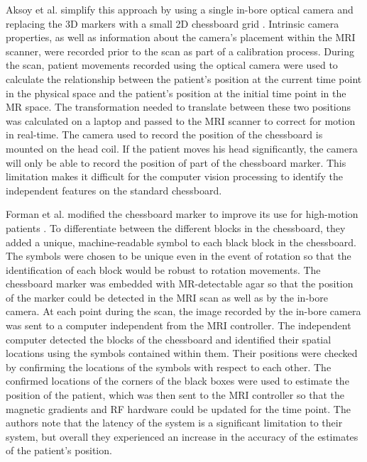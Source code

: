 Aksoy et al. simplify this approach by using a single in-bore optical camera and replacing the 3D markers with a small 2D chessboard grid \cite{Aksoy2008}. Intrinsic camera properties, as well as information about the camera's placement within the MRI scanner, were recorded prior to the scan as part of a calibration process. During the scan, patient movements recorded using the optical camera were used to calculate the relationship between the patient's position at the current time point in the physical space and the patient's position at the initial time point in the MR space. The transformation needed to translate between these two positions was calculated on a laptop and passed to the MRI scanner to correct for motion in real-time. The camera used to record the position of the chessboard is mounted on the head coil. If the patient moves his head significantly, the camera will only be able to record the position of part of the chessboard marker. This limitation makes it difficult for the computer vision processing to identify the independent features on the standard chessboard. 

Forman et al. modified the chessboard marker to improve its use for high-motion patients \cite{Forman2011}. To differentiate between the different blocks in the chessboard, they added a unique, machine-readable symbol to each black block in the chessboard. The symbols were chosen to be unique even in the event of rotation so that the identification of each block would be robust to rotation movements. The chessboard marker was embedded with MR-detectable agar so that the position of the marker could be detected in the MRI scan as well as by the in-bore camera. At each point during the scan, the image recorded by the in-bore camera was sent to a computer independent from the MRI controller. The independent computer detected the blocks of the chessboard and identified their spatial locations using the symbols contained within them. Their positions were checked by confirming the locations of the symbols with respect to each other. The confirmed locations of the corners of the black boxes were used to estimate the position of the patient, which was then sent to the MRI controller so that the magnetic gradients and RF hardware could be updated for the time point. The authors note that the latency of the system is a significant limitation to their system, but overall they experienced an increase in the accuracy of the estimates of the patient's position.

